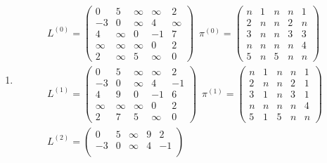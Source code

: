 \documentclass[11pt,a4paper]{article}
\begin{document}
\begin{loesung}
    \begin{enumerate}
        \item 
        \begin{align*}
            L^{(0)} = \begin{pmatrix}
                0 & 5 & \infty & \infty & 2 \\
                -3 & 0 & \infty & 4 & \infty \\
                4 & \infty & 0 & -1 & 7 \\
                \infty & \infty & \infty & 0 & 2 \\
                2 & \infty & 5 & \infty & 0
            \end{pmatrix}\,\,\,
            \pi^{(0)} = \begin{pmatrix}
                n & 1 & n & n & 1 \\
                2 & n & n & 2 & n \\
                3 & n & n & 3 & 3 \\
                n & n & n & n & 4 \\
                5 & n & 5 & n & n
            \end{pmatrix} \\
            L^{(1)} = \begin{pmatrix}
                0 & 5 & \infty & \infty & 2 \\
                -3 & 0 & \infty & 4 & -1 \\
                4 & 9 & 0 & -1 & 6 \\
                \infty & \infty & \infty & 0 & 2 \\
                2 & 7 & 5 & \infty & 0
            \end{pmatrix}\,\,\,
            \pi^{(1)} = \begin{pmatrix}
                n & 1 & n & n & 1 \\
                2 & n & n & 2 & 1 \\
                3 & 1 & n & 3 & 1 \\
                n & n & n & n & 4 \\
                5 & 1 & 5 & n & n
            \end{pmatrix} \\
            L^{(2)} = \begin{pmatrix}
                0 & 5 & \infty & 9 & 2 \\
                -3 & 0 & \infty & 4 & -1 \\

\end{pmatrix}
\end{align*}
\end{enumerate}
\end{loesung}
\end{document}

